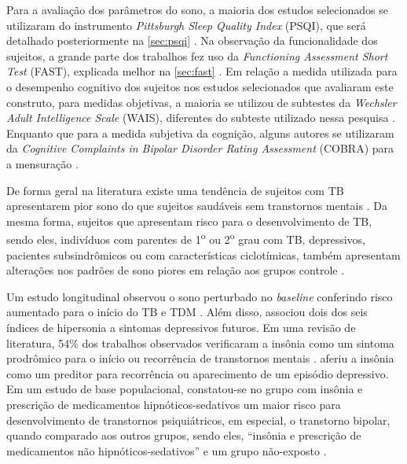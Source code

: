 \documentclass[chapter=TITLE,
               oneside,
               12pt,
               a4paper,
               english,
               brazil]{abntex2}    %
\begin{document}
        Para a avaliação dos parâmetros do sono, a maioria dos estudos selecionados
        se utilizaram do instrumento \textit{Pittsburgh Sleep Quality Index} (PSQI),
        que será detalhado posteriormente na \autoref{sec:psqi}
        \parencite{buysse_pittsburgh_1989}.
        Na observação da funcionalidade dos sujeitos, a grande parte dos trabalhos
        fez uso da \textit{Functioning Assessment Short Test} (FAST), explicada
        melhor na \autoref{sec:fast}
        \parencite{rosa_validity_2007}.
        Em relação a medida utilizada para o desempenho cognitivo dos sujeitos nos
        estudos selecionados que avaliaram este construto, para medidas objetivas,
        a maioria se utilizou de subtestes da
        \textit{Wechsler Adult Intelligence Scale} (WAIS),
        diferentes do subteste utilizado nessa pesquisa
        \parencite{wechsler_wais_2004}.
        Enquanto que para a medida subjetiva da cognição, alguns autores 
        se utilizaram da
        \textit{Cognitive Complaints in Bipolar Disorder Rating Assessment} (COBRA)
        para a mensuração
        \parencite{luo_subjective_2020,
        lin_associations_2019}.

        De forma geral na literatura existe uma tendência de sujeitos com TB
        apresentarem pior sono do que sujeitos saudáveis sem transtornos mentais
        \parencite{boland_associations_2015,
        russo_relationship_2015,
        lai_familiality_2014,
        bradley_sleep_2017,
        st-amand_sleep_2013,
        slyepchenko_association_2019}.
        Da mesma forma, sujeitos que apresentam risco para o desenvolvimento de TB,
        sendo eles, indivíduos com parentes de
        1\textsuperscript{o} ou 2\textsuperscript{o}
        grau com TB, depressivos, pacientes subsindrômicos ou com características
        ciclotímicas, também apresentam alterações nos padrões de
        sono piores em relação aos grupos controle
        \parencite{zanini_abnormalities_2015,
        ritter_characteristics_2012}.

        Um estudo longitudinal observou o sono perturbado no \textit{baseline}
        conferindo risco aumentado para o início do TB e TDM
        \parencite{ritter_disturbed_2015}.
        Além disso, \textcite{kaplan_hypersomnia_2011} associou dois dos seis índices
        de hipersonia a sintomas depressivos futuros. 
        Em uma revisão de literatura, 54\% dos trabalhos observados verificaram
        a insônia como um sintoma prodrômico para o início ou recorrência
        de transtornos mentais
        \parencite{van_meter_bipolar_2016}.
        \textcite{andrade-gonzalez_initial_2020} aferiu a insônia como um
        preditor para recorrência ou aparecimento de um episódio depressivo. 
        Em um estudo de base populacional, constatou-se no grupo com insônia
        e prescrição de medicamentos hipnóticos-sedativos um maior risco
        para desenvolvimento de transtornos psiquiátricos, em especial,
        o transtorno bipolar, quando comparado aos outros grupos, sendo 
        eles, ``insônia e prescrição de medicamentos não hipnóticos-sedativos''
        e um grupo não-exposto
        \parencite{chung_risk_2015}.
\end{document}
